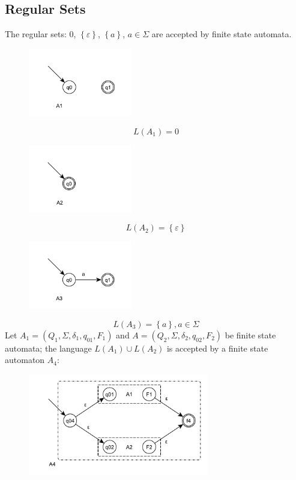 \subsection{Regular Sets}
The regular sets: $0$, $\left\{\varepsilon\right\}$, $\left\{a\right\}$, $a \in \Sigma$ are accepted by finite state automata.
\begin{figure}[H]
    \centerline{\includegraphics[width=0.4\textwidth]{img/4.pdf}}
\end{figure}
$$
    L(A_1) = 0
$$
\begin{figure}[H]
    \centerline{\includegraphics[width=0.4\textwidth]{img/5.pdf}}
\end{figure}
$$
    L(A_2) = \left\{\varepsilon\right\}
$$
\begin{figure}[H]
    \centerline{\includegraphics[width=0.4\textwidth]{img/6.pdf}}
\end{figure}
$$
    L(A_3) = \left\{a\right\}, a \in \Sigma
$$
Let $A_1 = (Q_1, \Sigma, \delta_1, q_{01}, F_1)$ and $A = (Q_2, \Sigma, \delta_2, q_{02}, F_2)$ be finite state automata; the language $L(A_1) \cup L(A_2)$ is accepted by a finite state automaton $A_4$:
\begin{figure}[H]
    \centerline{\includegraphics[width=0.7\textwidth]{img/7.pdf}}
\end{figure}

